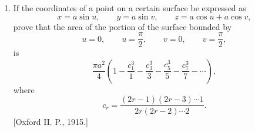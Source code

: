 \documentclass[11pt, a4paper]{article}
\newcommand{\source}[1]{\hfill\textnormal{[#1]}}
\begin{document}
\begin{enumerate}[leftmargin=2em]
\item[53.] If the coordinates of a point on a certain surface be expressed as
\[
x=a\sin u,\qquad y=a\sin v,\qquad z=a\cos u+a\cos v,
\]
prove that the area of the portion of the surface bounded by
\[
u=0,\qquad u=\frac{\pi}{2},\qquad v=0,\qquad v=\frac{\pi}{2},
\]
is
\[
\frac{\pi a^2}{4}
\left(
1-\frac{c_1^3}{1}-\frac{c_3^3}{3}-\frac{c_5^3}{5}-\frac{c_7^3}{7}-\cdots
\right),
\]
where
\[
c_r=\frac{(2r-1)(2r-3)\cdots1}{2r(2r-2)\cdots2}.
\]
\source{Oxford II. P., 1915.}

\end{enumerate}
\end{document}
